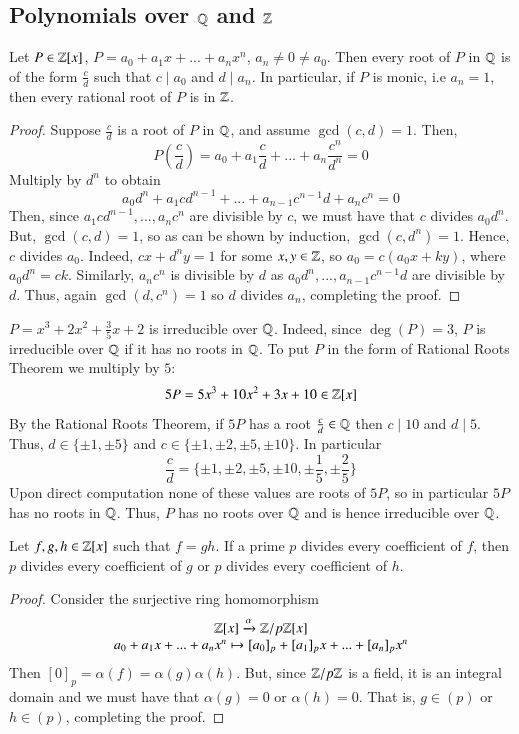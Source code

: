 \documentclass[12pt, a4paper, oneside, openright, titlepage]{book}
\begin{document}
\subsection{\textsection \texorpdfstring{Polynomials over $\mathbb Q$ and $\mathbb Z$}{}}

\begin{namthm}
    Let $P \in \mathbb Z[x]$, $P = a_0+a_1x+...+a_nx^n$, $a_n \neq 0 \neq a_0$. Then every root of $P$ in $\mathbb Q$ is of the form $\frac{c}{d}$ such that $c\;\vert\;a_0$ and $d\;\vert\;a_n$. In particular, if $P$ is monic, i.e $a_n = 1$, then every rational root of $P$ is in $\mathbb Z$.
\end{namthm}
\begin{proof}
    Suppose $\frac{c}{d}$ is a root of $P$ in $\mathbb Q$, and assume $\gcd(c,d) = 1$. Then, $$P\left(\frac{c}{d}\right) = a_0+a_1\frac{c}{d}+ ... + a_n\frac{c^n}{d^n} = 0$$
    Multiply by $d^n$ to obtain $$a_0d^n+a_1cd^{n-1}+...+a_{n-1}c^{n-1}d+a_nc^n = 0$$
    Then, since $a_1cd^{n-1},...,a_nc^n$ are divisible by $c$, we must have that $c$ divides $a_0d^n$. But, $\gcd(c,d) = 1$, so as can be shown by induction, $\gcd(c,d^n) = 1$. Hence, $c$ divides $a_0$. Indeed, $cx+d^ny = 1$ for some $x,y \in \mathbb Z$, so $a_0 = c(a_0x+ky)$, where $a_0d^n = ck$. Similarly, $a_nc^n$ is divisible by $d$ as $a_0d^n,...,a_{n-1}c^{n-1}d$ are divisible by $d$. Thus, again $\gcd(d,c^n) = 1$ so $d$ divides $a_n$, completing the proof.
\end{proof}

\begin{eg}
    $P = x^3+2x^2+\frac{3}{5}x+2$ is irreducible over $\mathbb Q$. Indeed, since $\deg(P) = 3$, $P$ is irreducible over $\mathbb Q$ if it has no roots in $\mathbb Q$. To put $P$ in the form of Rational Roots Theorem we multiply by $5$:
    $$5P = 5x^3+10x^2+3x+10 \in \mathbb Z[x]$$
    By the Rational Roots Theorem, if $5P$ has a root $\frac{c}{d} \in \mathbb Q$ then $c\;\vert\;10$ and $d\;\vert\;5$. Thus, $d \in \{\pm 1,\pm 5\}$ and $c \in \{\pm1,\pm2,\pm5,\pm10\}$. In particular $$\frac{c}{d} = \{\pm1,\pm2,\pm5,\pm10,\pm\frac{1}{5},\pm\frac{2}{5}\}$$
    Upon direct computation none of these values are roots of $5P$, so in particular $5P$ has no roots in $\mathbb Q$. Thus, $P$ has no roots over $\mathbb Q$ and is hence irreducible over $\mathbb Q$.
\end{eg}

\begin{namthm}
    Let $f,g,h \in \mathbb Z[x]$ such that $f = gh$. If a prime $p$ divides every coefficient of $f$, then $p$ divides every coefficient of $g$ or $p$ divides every coefficient of $h$.
\end{namthm}
\begin{proof}
    Consider the surjective ring homomorphism $$\begin{array}{c} \mathbb Z[x]\xrightarrow{\alpha}{\mathbb Z/p\mathbb Z[x]} \\ a_0+a_1x+...+a_nx^n\mapsto [a_0]_p+[a_1]_px+...+[a_n]_px^n \end{array}$$
    Then $[0]_p = \alpha(f) = \alpha(g)\alpha(h)$. But, since $\mathbb Z/p\mathbb Z$ is a field, it is an integral domain and we must have that $\alpha(g) = 0$ or $\alpha(h) = 0$. That is, $g \in (p)$ or $h \in (p)$, completing the proof.
\end{proof}
\end{document}
